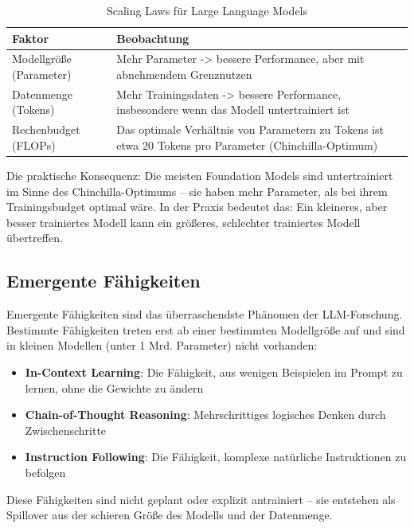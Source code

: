 \begin{table}[H]
\centering
\begin{tabularx}{\linewidth}{lX}
\toprule
\textbf{Faktor} & \textbf{Beobachtung} \\
\midrule
Modellgröße (Parameter) & Mehr Parameter -> bessere Performance, aber mit abnehmendem Grenznutzen \\
Datenmenge (Tokens) & Mehr Trainingsdaten -> bessere Performance, insbesondere wenn das Modell untertrainiert ist \\
Rechenbudget (FLOPs) & Das optimale Verhältnis von Parametern zu Tokens ist etwa 20 Tokens pro Parameter (Chinchilla-Optimum) \\
\bottomrule
\end{tabularx}
\caption{Scaling Laws für Large Language Models}
\label{tab:scaling-laws}
\end{table}

Die praktische Konsequenz: Die meisten Foundation Models sind \glqq untertrainiert\grqq{} im Sinne des Chinchilla-Optimums -- sie haben mehr Parameter, als bei ihrem Trainingsbudget optimal wäre. In der Praxis bedeutet das: Ein kleineres, aber besser trainiertes Modell kann ein größeres, schlechter trainiertes Modell übertreffen.

\subsection{Emergente Fähigkeiten}

Emergente Fähigkeiten sind das überraschendste Phänomen der LLM-Forschung. Bestimmte Fähigkeiten treten erst ab einer bestimmten Modellgröße auf und sind in kleinen Modellen (unter 1 Mrd. Parameter) nicht vorhanden:

\begin{itemize}[leftmargin=*]
    \item \textbf{In-Context Learning}: Die Fähigkeit, aus wenigen Beispielen im Prompt zu lernen, ohne die Gewichte zu ändern
    \item \textbf{Chain-of-Thought Reasoning}: Mehrschrittiges logisches Denken durch Zwischenschritte
    \item \textbf{Instruction Following}: Die Fähigkeit, komplexe natürliche Instruktionen zu befolgen
\end{itemize}

Diese Fähigkeiten sind nicht geplant oder explizit antrainiert -- sie entstehen als \glqq Spillover\grqq{} aus der schieren Größe des Modells und der Datenmenge.

